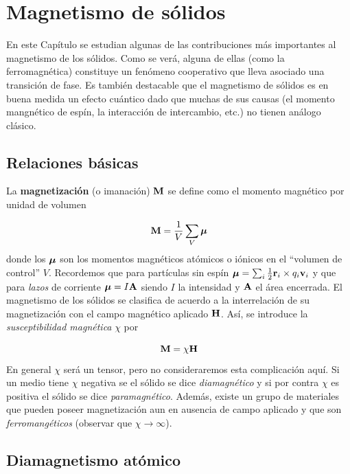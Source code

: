 \chapter{Magnetismo de sólidos} \label{Ch:10}

En este Capítulo se estudian algunas de las contribuciones más importantes al magnetismo de los sólidos. Como se verá, alguna de ellas (como la ferromagnética) constituye un fenómeno cooperativo que lleva asociado una transición de fase. Es también destacable que el magnetismo de sólidos es en buena medida un efecto cuántico dado que muchas de sus causas (el momento mangnético de espín, la interacción de intercambio, etc.) no tienen análogo clásico.

\section{Relaciones básicas}

La \textbf{magnetización} (o imanación) $\mathbf{M}$ se define como el momento magnético por unidad de volumen 

\begin{equation}
	\mathbf{M} = \frac{1}{V} \sum_V \boldsymbol{\mu}	
\end{equation}
donde los $\boldsymbol{\mu}$ son los momentos magnéticos atómicos o iónicos en el ``volumen de control'' $V$. Recordemos que para partículas sin espín $\boldsymbol{\mu} =  \sum_i \frac{1}{2} \mathbf{r}_i \times q_i \mathbf{v}_i$ y que para \textit{lazos} de corriente $\boldsymbol{\mu}  = I \mathbf{A}$ siendo $I$ la intensidad y  $\mathbf{A}$ el área encerrada. El magnetismo de los sólidos se clasifica de acuerdo a la interrelación de su magnetización con el campo magnético aplicado $\mathbf{H}$. Así, se introduce la \textit{susceptibilidad magnética} $\chi$ por 

\begin{equation}
	\mathbf{M} = \chi \mathbf{H}
\end{equation}
En general $\chi$ será un tensor, pero no consideraremos esta complicación aquí. Si un medio tiene $\chi$ negativa se el sólido se dice \textit{diamagnético} y si por contra $\chi$ es positiva el sólido se dice \textit{paramagnético}. Además, existe un grupo de materiales que pueden poseer magnetización aun en ausencia de campo aplicado y que son \textit{ferromangéticos} (observar que $\chi \rightarrow \infty$).

\section{Diamagnetismo atómico}

